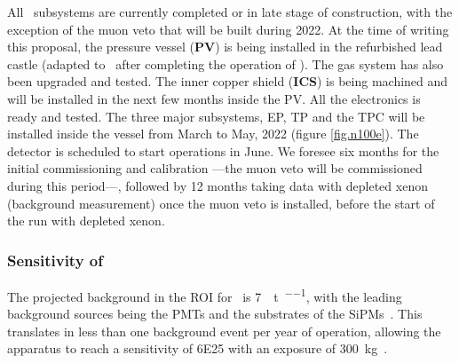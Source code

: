 All \Next\ subsystems are currently completed or in late stage of construction, with the exception of the muon veto that will be built during 2022. At the time of writing this proposal, the pressure vessel ({\bf PV}) is being installed in the refurbished lead castle (adapted to \Next\ after completing the operation of \NEW). The gas system has also been upgraded and tested. The inner copper shield  ({\bf ICS}) is being machined and will be installed in the next few months inside the PV. All the electronics is ready and tested. The three major subsystems, EP, TP and the TPC will be installed inside the vessel from March to May, 2022 (figure \ref{fig.n100e}). The detector is scheduled to start operations in June. We foresee six months for the initial commissioning and calibration ---the muon veto will be commissioned during this period---, followed by 12 months taking data with depleted xenon (background measurement) once the muon veto is installed, before the start of the run with depleted xenon. 


\subsubsection{Sensitivity of \Next}

The projected background in the ROI for \Next\ is \SI{7}{\ev\per\tonne\per\yr}, with the leading background sources being the PMTs and the substrates of the SiPMs~\cite{Martin-Albo:2015rhw}.  This translates in less than one background event per year of operation, allowing the apparatus to reach 
a sensitivity of \SI{6E25}{\yr} with an exposure of \SI{300}{\kg\yr}. 



